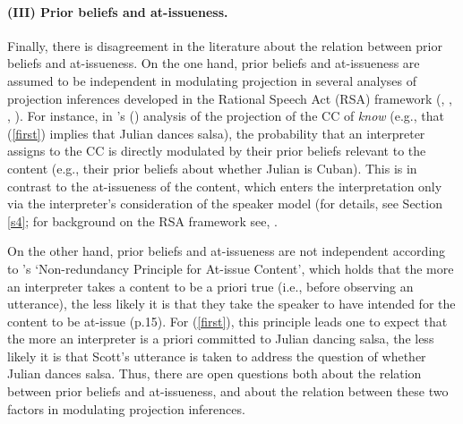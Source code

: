 \documentclass[11pt,fleqn]{article}
\newcommand{\6}{\mbox{$[\hspace*{-.6mm}[$}}
\newcommand{\9}{\mbox{$]\hspace*{-.6mm}]$}}
\newcommand{\citepos}[1]{\citeauthor{#1}'s \citeyear{#1}}
\newcommand{\citetpos}[1]{\citeauthor{#1}'s (\citeyear{#1})}
\begin{document}
\paragraph{(III) Prior beliefs and at-issueness.} Finally, there is disagreement in the literature about the relation between prior beliefs and at-issueness. On the one hand, prior beliefs and at-issueness are assumed to be independent in modulating projection in several analyses of projection inferences developed in the Rational Speech Act (RSA) framework (\citealt*{qing-etal2016}, \citealt*{stevens-etal2017}, \citealt{warstadt2022}, \citealt{pan-degen2023,scontras-tonhauser2025}). %
For instance, in \citetpos{scontras-tonhauser2025} analysis of the projection of the CC of \emph{know} (e.g., that (\ref{first}) implies that Julian dances salsa), the probability that an interpreter assigns to the CC is directly modulated by their prior beliefs relevant to the content (e.g., their prior beliefs about whether Julian is Cuban). This is in contrast to the at-issueness of the content, which enters the interpretation only via the interpreter's consideration of the speaker model (for details, see Section \ref{s4}; for background on the RSA framework see, \citep[e.g.,][]{degen2023-RSA}. 

On the other hand, prior beliefs and at-issueness are not independent according to \citepos{tonhauser-etal-eval} `Non-redundancy Principle for At-issue Content', which holds that the more an interpreter takes a content to be a priori true (i.e., before observing an utterance), the less likely it is that they take the speaker to have intended for the content to be at-issue (p.15).  For (\ref{first}), this principle leads one to expect that the more an interpreter is a priori committed to Julian dancing salsa, the less likely it is that Scott's utterance is taken to address the question of whether Julian dances salsa.  Thus, there are open questions both about the relation between prior beliefs and at-issueness, and about the relation between these two factors in modulating projection inferences.

\medskip
\end{document}
